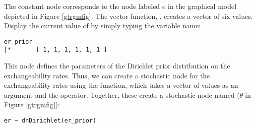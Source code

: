 The constant node  corresponds to the node labeled $e$ in the graphical model depicted in Figure \ref{gtrgmfig}. 
The vector function, , creates a vector of six values. 
Display the current value of  by simply typing the variable name:
{\tt \begin{snugshade*}
\begin{lstlisting}
er_prior
|*       [ 1, 1, 1, 1, 1, 1 ]
\end{lstlisting}
\end{snugshade*}}
This node defines the parameters of the Dirichlet prior distribution on the exchangeability rates. Thus, we can create a stochastic node for the exchangeability rates using the  function, which takes a vector of values as an argument and the \cl{\rbdn} operator. Together, these create a stochastic node named  ($\theta$ in Figure \ref{gtrgmfig}): 
{\tt \begin{snugshade*}
\begin{lstlisting}
er ~ dnDirichlet(er_prior)
\end{lstlisting}
\end{snugshade*}}


